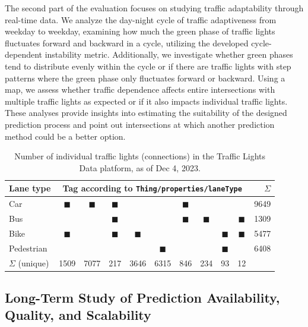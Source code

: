The second part of the evaluation focuses on studying traffic adaptability through real-time data. We analyze the day-night cycle of traffic adaptiveness from weekday to weekday, examining how much the green phase of traffic lights fluctuates forward and backward in a cycle, utilizing the developed cycle-dependent instability metric. Additionally, we investigate whether green phases tend to distribute evenly within the cycle or if there are traffic lights with step patterns where the green phase only fluctuates forward or backward. Using a map, we assess whether traffic dependence affects entire intersections with multiple traffic lights as expected or if it also impacts individual traffic lights. These analyses provide insights into estimating the suitability of the designed prediction process and point out intersections at which another prediction method could be a better option.

\begin{table}[b]
    \centering
    \begin{tabular}{@{}l|ccccccccc|r@{}}
        \hline
        \textbf{Lane type} & \multicolumn{9}{c|}{\textbf{Tag according to \texttt{Thing/properties/laneType}}} & $\Sigma$ \\
        \hline
        Car        & $\blacksquare$ & $\blacksquare$ & $\blacksquare$ &   &   & $\blacksquare$ &   &   &   &  9649 \\
        Bus        &   &   & $\blacksquare$ &   &   & $\blacksquare$ & $\blacksquare$ &   & $\blacksquare$ &  1309 \\
        Bike     & $\blacksquare$ &   & $\blacksquare$ & $\blacksquare$ &   &   &   & $\blacksquare$ & $\blacksquare$ &  5477 \\
        Pedestrian &   &   &   &   & $\blacksquare$ &   &   & $\blacksquare$ &   &  6408 \\
        \hline
        $\Sigma$ (unique) & 1509 & 7077 & 217 & 3646 & 6315 & 846 & 234 & 93 & 12 & \\
        \hline
    \end{tabular}
    \caption{Number of individual traffic lights (connections) in the Traffic Lights Data platform, as of Dec 4, 2023.}
    \label{tab:tld-number-of-things}
\end{table}


\subsection{Long-Term Study of Prediction Availability, Quality, and Scalability}


